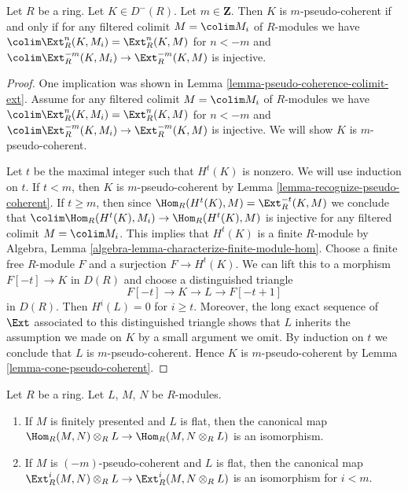 \begin{lemma}
\label{lemma-characterize-pseudo-coherent-colimit-ext}
Let $R$ be a ring. Let $K \in D^-(R)$. Let $m \in \mathbf{Z}$.
Then $K$ is $m$-pseudo-coherent if and only if
for any filtered colimit $M = \colim M_i$ of $R$-modules we have
$\colim \Ext^n_R(K, M_i) = \Ext^n_R(K, M)$ for $n < -m$ and
$\colim \Ext^{-m}_R(K, M_i) \to \Ext^{-m}_R(K, M)$ is injective.
\end{lemma}

\begin{proof}
One implication was shown in Lemma \ref{lemma-pseudo-coherence-colimit-ext}.
Assume for any filtered colimit $M = \colim M_i$ of $R$-modules we have
$\colim \Ext^n_R(K, M_i) = \Ext^n_R(K, M)$ for $n < -m$ and
$\colim \Ext^{-m}_R(K, M_i) \to \Ext^{-m}_R(K, M)$ is injective.
We will show $K$ is $m$-pseudo-coherent.

\medskip\noindent
Let $t$ be the maximal integer such that $H^t(K)$ is nonzero.
We will use induction on $t$. If $t < m$, then $K$ is $m$-pseudo-coherent
by Lemma \ref{lemma-recognize-pseudo-coherent}.
If $t \geq m$, then since $\Hom_R(H^t(K), M) = \Ext^{-t}_R(K, M)$
we conclude that $\colim \Hom_R(H^t(K), M_i) \to \Hom_R(H^t(K), M)$
is injective for any filtered colimit $M = \colim M_i$.
This implies that $H^t(K)$ is a finite $R$-module by Algebra,
Lemma \ref{algebra-lemma-characterize-finite-module-hom}.
Choose a finite free $R$-module $F$ and a surjection
$F \to H^t(K)$. We can lift this to a morphism $F[-t] \to K$
in $D(R)$ and choose a distinguished triangle
$$
F[-t] \to K \to L \to F[-t + 1]
$$
in $D(R)$. Then $H^i(L) = 0$ for $i \geq t$. Moreover, the long
exact sequence of $\Ext$ associated to this distinguished triangle
shows that $L$ inherits the assumption we made on $K$ by a small
argument we omit. By induction on $t$ we conclude that
$L$ is $m$-pseudo-coherent. Hence $K$ is $m$-pseudo-coherent
by Lemma \ref{lemma-cone-pseudo-coherent}.
\end{proof}

\begin{lemma}
\label{lemma-pseudo-coherence-and-ext}
Let $R$ be a ring. Let $L$, $M$, $N$ be $R$-modules.
\begin{enumerate}
\item If $M$ is finitely presented and $L$ is flat, then the canonical map
$\Hom_R(M, N) \otimes_R L \to \Hom_R(M, N \otimes_R L)$
is an isomorphism.
\item If $M$ is $(-m)$-pseudo-coherent and $L$ is flat, then the canonical map
$\Ext^i_R(M, N) \otimes_R L \to \Ext^i_R(M, N \otimes_R L)$
is an isomorphism for $i < m$.
\end{enumerate}
\end{lemma}

